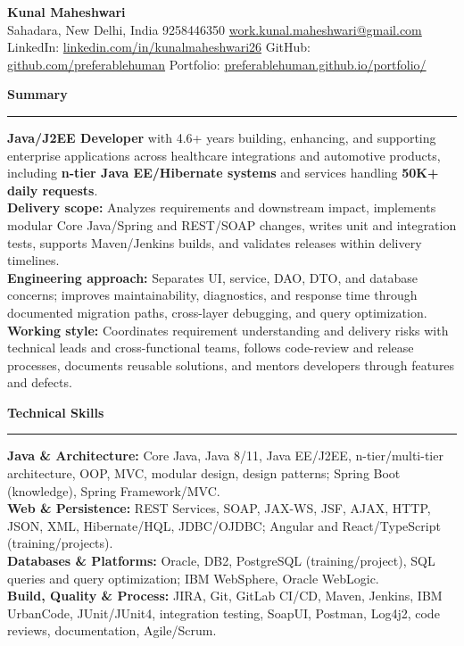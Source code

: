 \documentclass[11pt,letterpaper]{article}
\newcommand{\ressection}[1]{\Needspace{6\baselineskip}\vspace{8pt}\par\textbf{#1}\par\vspace{2pt}\hrule\vspace{5pt}}
\begin{document}
\pagestyle{empty}\raggedright\fontsize{11}{12.5}\selectfont

{\Large \textbf{Kunal Maheshwari}}\\
Sahadara, New Delhi, India \textbar{} 9258446350 \textbar{} \href{mailto:work.kunal.maheshwari@gmail.com}{work.kunal.maheshwari@gmail.com}\\
LinkedIn: \href{https://www.linkedin.com/in/kunalmaheshwari26}{linkedin.com/in/kunalmaheshwari26} \textbar{} GitHub: \href{https://github.com/preferablehuman}{github.com/preferablehuman} \textbar{} Portfolio: \href{https://preferablehuman.github.io/portfolio/}{preferablehuman.github.io/portfolio/}

\ressection{Summary}
\textbf{Java/J2EE Developer} with 4.6+ years building, enhancing, and supporting enterprise applications across healthcare integrations and automotive products, including \textbf{n-tier Java EE/Hibernate systems} and services handling \textbf{50K+ daily requests}.\\[2pt]
\textbf{Delivery scope:} Analyzes requirements and downstream impact, implements modular Core Java/Spring and REST/SOAP changes, writes unit and integration tests, supports Maven/Jenkins builds, and validates releases within delivery timelines.\\[2pt]
\textbf{Engineering approach:} Separates UI, service, DAO, DTO, and database concerns; improves maintainability, diagnostics, and response time through documented migration paths, cross-layer debugging, and query optimization.\\[2pt]
\textbf{Working style:} Coordinates requirement understanding and delivery risks with technical leads and cross-functional teams, follows code-review and release processes, documents reusable solutions, and mentors developers through features and defects.

\ressection{Technical Skills}
\textbf{Java \& Architecture:} Core Java, Java 8/11, Java EE/J2EE, n-tier/multi-tier architecture, OOP, MVC, modular design, design patterns; Spring Boot (knowledge), Spring Framework/MVC.\\
\textbf{Web \& Persistence:} REST Services, SOAP, JAX-WS, JSF, AJAX, HTTP, JSON, XML, Hibernate/HQL, JDBC/OJDBC; Angular and React/TypeScript (training/projects).\\
\textbf{Databases \& Platforms:} Oracle, DB2, PostgreSQL (training/project), SQL queries and query optimization; IBM WebSphere, Oracle WebLogic.\\
\textbf{Build, Quality \& Process:} JIRA, Git, GitLab CI/CD, Maven, Jenkins, IBM UrbanCode, JUnit/JUnit4, integration testing, SoapUI, Postman, Log4j2, code reviews, documentation, Agile/Scrum.
\end{document}
